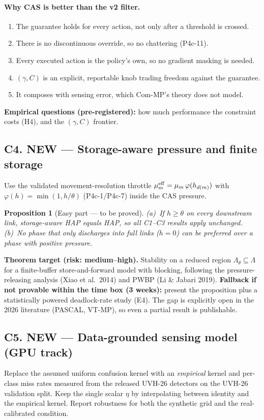 \documentclass[11pt,a4paper]{article}
\newtheorem{proposition}{Proposition}
\begin{document}
\paragraph{Why CAS is better than the v2 filter.}
\begin{enumerate}
\item The guarantee holds for every action, not only after a threshold is crossed.
\item There is no discontinuous override, so no chattering (P4c-11).
\item Every executed action is the policy's own, so no gradient masking is needed.
\item $(\gamma,C)$ is an explicit, reportable knob trading freedom against the guarantee.
\item It composes with sensing error, which Com-MP's theory does not model.
\end{enumerate}
\textbf{Empirical questions (pre-registered):} how much performance the constraint costs
(H4), and the $(\gamma,C)$ frontier.

\subsection*{C4. NEW --- Storage-aware pressure and finite storage}
Use the validated movement-resolution throttle $\mu_m^{\rm eff}=\mu_m\,\varphi(h_{d(m)})$
with $\varphi(h)=\min(1,h/\theta)$ (P4c-1/P4c-7) inside the CAS pressure.
\begin{proposition}[Easy part --- to be proved]
(a)~If $h\ge\theta$ on every downstream link, storage-aware HAP equals HAP, so all C1--C3
results apply unchanged.
(b)~No phase that only discharges into full links ($h=0$) can be preferred over a phase
with positive pressure.
\end{proposition}
\textbf{Theorem target (risk: medium--high).} Stability on a reduced region
$\Lambda_\theta\subseteq\Lambda$ for a finite-buffer store-and-forward model with blocking,
following the pressure-releasing analysis (Xiao et al.\ 2014) and PWBP (Li \& Jabari 2019).
\textbf{Fallback if not provable within the time box (3 weeks):} present the proposition plus
a statistically powered deadlock-rate study (E4). The gap is explicitly open in the 2026
literature (PASCAL, VT-MP), so even a partial result is publishable.

\subsection*{C5. NEW --- Data-grounded sensing model (GPU track)}
Replace the assumed uniform confusion kernel with an \emph{empirical} kernel and per-class
miss rates measured from the released UVH-26 detectors on the UVH-26 validation split.
Keep the single scalar $\eta$ by interpolating between identity and the empirical kernel.
Report robustness for both the synthetic grid and the real-calibrated condition.
\end{document}
